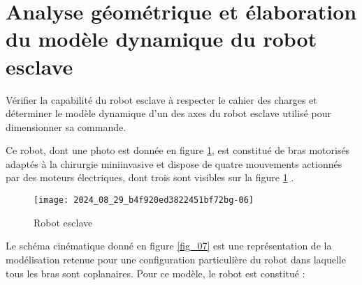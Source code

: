 \section{Analyse géométrique et élaboration du modèle dynamique du robot esclave}
\begin{obj}
Vérifier la capabilité du robot esclave à respecter le cahier des charges et déterminer le modèle dynamique d'un des axes du robot esclave utilisé pour dimensionner sa commande.
\end{obj}

Ce robot, dont une photo est donnée en figure \ref{fig_06}, est constitué de bras motorisés adaptés à la chirurgie miniinvasive et dispose de quatre mouvements actionnés par des moteurs électriques, dont trois sont visibles sur la figure \ref{fig_06} .

\begin{figure}[!h]
\centering
\texttt{[image: 2024\_08\_29\_b4f920ed3822451bf72bg-06]}
\caption{\label{fig_06}Robot esclave}
\end{figure}

Le schéma cinématique donné en figure \ref{fig_07} est une représentation de la modélisation retenue pour une configuration particulière du robot dans laquelle tous les bras sont coplanaires. Pour ce modèle, le robot est constitué :

